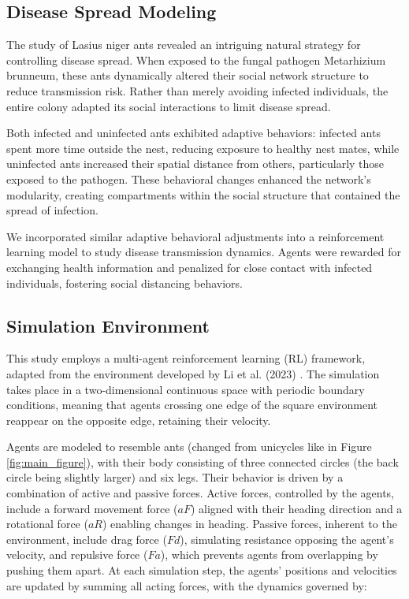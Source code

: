 \documentclass[9pt]{IEEEtran}
\begin{document}
\subsection{Disease Spread Modeling}

The study of Lasius niger ants \cite{Stroeymeyt2018} revealed an intriguing natural strategy for controlling disease spread. When exposed to the fungal pathogen Metarhizium brunneum, these ants dynamically altered their social network structure to reduce transmission risk. Rather than merely avoiding infected individuals, the entire colony adapted its social interactions to limit disease spread.

Both infected and uninfected ants exhibited adaptive behaviors: infected ants spent more time outside the nest, reducing exposure to healthy nest mates, while uninfected ants increased their spatial distance from others, particularly those exposed to the pathogen. These behavioral changes enhanced the network’s modularity, creating compartments within the social structure that contained the spread of infection.

We incorporated similar adaptive behavioral adjustments into a reinforcement learning model to study disease transmission dynamics. Agents were rewarded for exchanging health information and penalized for close contact with infected individuals, fostering social distancing behaviors.

\subsection{Simulation Environment}

This study employs a multi-agent reinforcement learning (RL) framework, adapted from the environment developed by Li et al. (2023) \cite{li2023predator}. The simulation takes place in a two-dimensional continuous space with periodic boundary conditions, meaning that agents crossing one edge of the square environment reappear on the opposite edge, retaining their velocity.

Agents are modeled to resemble ants (changed from unicycles like in Figure \ref{fig:main_figure}), with their body consisting of three connected circles (the back circle being slightly larger) and six legs. Their behavior is driven by a combination of active and passive forces. Active forces, controlled by the agents, include a forward movement force ($aF$) aligned with their heading direction and a rotational force ($aR$) enabling changes in heading. Passive forces, inherent to the environment, include drag force ($Fd$), simulating resistance opposing the agent's velocity, and repulsive force ($Fa$), which prevents agents from overlapping by pushing them apart. At each simulation step, the agents' positions and velocities are updated by summing all acting forces, with the dynamics governed by:
\end{document}
